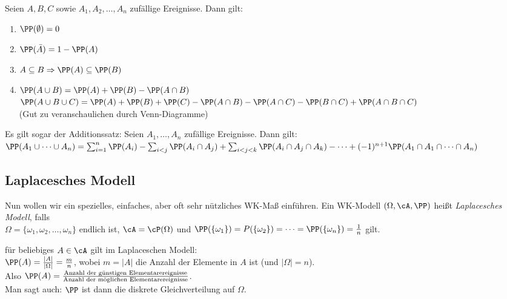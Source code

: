 \documentclass{scrreprt}
\renewenvironment{anumerate}{\begin{enumerate}[label=(\alph*)]}{\end{enumerate}} %
\begin{document}
 Seien $A,B,C$ sowie $A_1, A_2, \dots ,A_n$ zufällige Ereignisse. Dann gilt:
\begin{anumerate}
\item $\PP(\emptyset)=0$
\item $\PP(\bar A) = 1 - \PP (A)$
\item $A \subseteq B \Rightarrow \PP(A) \subseteq \PP (B)$
\item $\PP(A \cup B)=\PP(A)+\PP(B)-\PP(A \cap B)$\\
$\PP ( A \cup B \cup C) = \PP(A) + \PP(B) + \PP(C)-\PP(A \cap B) - \PP(A\cap C) - \PP(B\cap C ) + \PP(A \cap B \cap C)$\\
(Gut zu veranschaulichen durch Venn-Diagramme)
\end{anumerate}
Es gilt sogar der Additionssatz:
 Seien $A_1, \dots, A_n$ zufällige Ereignisse. Dann gilt: \\
$\PP(A_1 \cup \dots \cup A_n)=\sum_{i=1}^n \PP(A_i)-\sum_{i<j} \PP(A_i \cap A_j) + \sum_{i<j<k}\PP(A_i \cap A_j \cap A_k) - \dots + (-1)^{n+1} \PP(A_1\cap A_1 \cap \dots \cap A_n)$

\subsection{Laplacesches Modell}
Nun wollen wir ein spezielles, einfaches, aber oft sehr nützliches WK-Maß einführen.
 Ein WK-Modell $(\Omega, \cA, \PP)$ heißt \emph{Laplacesches Modell}, falls \\$\Omega = \{\omega_1, \omega_2, \dots , \omega_n\}$ endlich ist, $\cA = \cP ( \Omega)$ und $\PP(\{\omega_1\})=P(\{\omega_2\})=\dots = \PP(\{\omega_n\})=\frac{1}{n}$ gilt.

 für beliebiges $A \in \cA$ gilt im Laplaceschen Modell:\\
$\PP(A) = \frac{|A|}{|\Omega|}=\frac{m}{n}$, wobei $m=|A|$ die Anzahl der Elemente in $A$ ist (und $|\Omega|=n$).\\
Also $\PP(A)=\frac{\text{Anzahl der günstigen Elementarereignisse}}{\text{Anzahl der möglichen Elementarereignisse}}$.\\
Man sagt auch: $\PP$ ist dann die diskrete Gleichverteilung auf $\Omega$.
\end{document}

